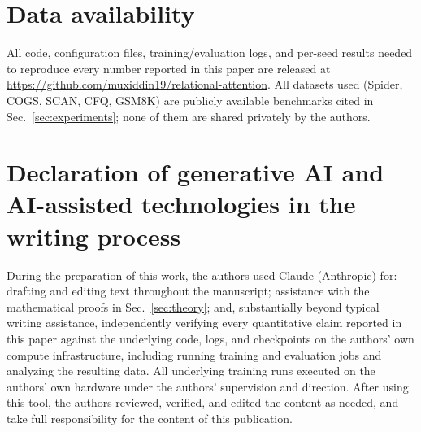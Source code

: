 \documentclass[review]{elsarticle}
\begin{document}
\section*{Data availability}
All code, configuration files, training/evaluation logs, and per-seed results needed to reproduce every number reported in this paper are released at \url{https://github.com/muxiddin19/relational-attention}. All datasets used (Spider, COGS, SCAN, CFQ, GSM8K) are publicly available benchmarks cited in Sec.~\ref{sec:experiments}; none of them are shared privately by the authors.

\section*{Declaration of generative AI and AI-assisted technologies in the writing process}
During the preparation of this work, the authors used Claude (Anthropic) for: drafting and editing text throughout the manuscript; assistance with the mathematical proofs in Sec.~\ref{sec:theory}; and, substantially beyond typical writing assistance, independently verifying every quantitative claim reported in this paper against the underlying code, logs, and checkpoints on the authors' own compute infrastructure, including running training and evaluation jobs and analyzing the resulting data. All underlying training runs executed on the authors' own hardware under the authors' supervision and direction. After using this tool, the authors reviewed, verified, and edited the content as needed, and take full responsibility for the content of this publication.



\end{document}
